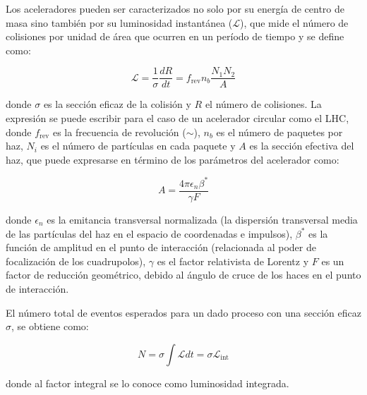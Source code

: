 Los aceleradores pueden ser caracterizados no solo por su energía de centro de masa sino también por su luminosidad instantánea ($\mathcal{L}$), que mide el número de colisiones por unidad de área que ocurren en un período de tiempo y se define como: 

\begin{equation}
\mathcal{L}= \frac{1}{\sigma}\frac{dR}{dt} = f_{\text{rev}}n_{b}\frac{N_{1}N_{2}}{A}
\end{equation}

\noindent
donde $\sigma$ es la sección eficaz de la colisión y $R$ el número de colisiones. La expresión se puede escribir para el caso de un acelerador circular como el LHC, donde $f_{\text{rev}}$ es la frecuencia de revolución ($\sim$), $n_{b}$ es el número de paquetes por haz, $N_{i}$ es el número de partículas en cada paquete y $A$ es la sección efectiva del haz, que puede expresarse en término de los parámetros del acelerador como:

\begin{equation}
A=\frac{4 \pi \epsilon_{n}\beta^{*}}{\gamma F}
\end{equation} 

\noindent
donde $\epsilon_{n}$ es la emitancia transversal normalizada (la dispersión transversal media de las partículas del  haz en el espacio de coordenadas e impulsos), $\beta^{*}$ es la función de amplitud en el punto de interacción (relacionada al poder de focalización de los cuadrupolos), $\gamma$ es el factor relativista de Lorentz y $F$ es un factor de reducción geométrico, debido al ángulo de cruce de los haces en el punto de interacción.

El número total de eventos esperados para un dado proceso con una sección eficaz $\sigma$, se obtiene como:

\begin{equation}
N=\sigma \int \mathcal{L} dt = \sigma \mathcal{L}_{\text{int}}
\label{eq:lumi_xs}
\end{equation}	

\noindent
donde al factor integral se lo conoce como luminosidad integrada.

